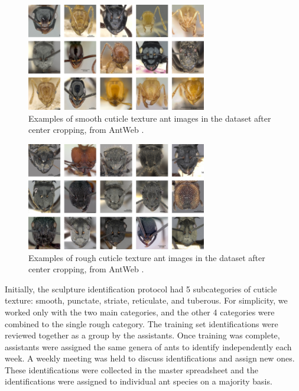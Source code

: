 \documentclass{aci}
\numberwithin{equation}{section}
\begin{document}
\begin{figure}
    \centering
    \includegraphics[width=0.7\textwidth]{assets/images/smooth_full_collage.png}
    \caption{Examples of smooth cuticle texture ant images in the dataset after
        center cropping, from AntWeb \cite{perrichot_antweb_2012}.}
    \label{fig:smooth-cuticle-texture}
\end{figure}

\begin{figure}
    \centering
    \includegraphics[width=0.7\textwidth]{assets/images/rough_full_collage.png}
    \caption{Examples of rough cuticle texture ant images in the dataset after
        center cropping, from AntWeb \cite{perrichot_antweb_2012}.}
    \label{fig:rough-cuticle-texture}
\end{figure}

Initially, the sculpture identification protocol had 5 subcategories of cuticle
texture: smooth, punctate, striate, reticulate, and tuberous. For simplicity, we
worked only with the two main categories, and the other 4 categories were
combined to the single rough category. The training set identifications were
reviewed together as a group by the assistants. Once training was complete,
assistants were assigned the same genera of ants to identify independently each
week. A weekly meeting was held to discuss identifications and assign new ones.
These identifications were collected in the master spreadsheet and the
identifications were assigned to individual ant species on a majority basis.
\end{document}

